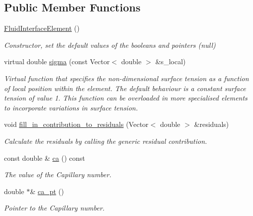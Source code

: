 \subsection*{Public Member Functions}
\begin{DoxyCompactItemize}
\item 
\hyperlink{classoomph_1_1FluidInterfaceElement_a4bd4a44ee08780fb8ba1be83c4353dd4}{Fluid\+Interface\+Element} ()
\begin{DoxyCompactList}\small\item\em Constructor, set the default values of the booleans and pointers (null) \end{DoxyCompactList}\item 
virtual double \hyperlink{classoomph_1_1FluidInterfaceElement_a7e5c3ca1eba5d4dd44c0eab9be252c2a}{sigma} (const Vector$<$ double $>$ \&s\+\_\+local)
\begin{DoxyCompactList}\small\item\em Virtual function that specifies the non-\/dimensional surface tension as a function of local position within the element. The default behaviour is a constant surface tension of value 1. This function can be overloaded in more specialised elements to incorporate variations in surface tension. \end{DoxyCompactList}\item 
void \hyperlink{classoomph_1_1FluidInterfaceElement_a3f66ffd5d9a8b9b6bd8cd54e90ce2d61}{fill\+\_\+in\+\_\+contribution\+\_\+to\+\_\+residuals} (Vector$<$ double $>$ \&residuals)
\begin{DoxyCompactList}\small\item\em Calculate the residuals by calling the generic residual contribution. \end{DoxyCompactList}\item 
const double \& \hyperlink{classoomph_1_1FluidInterfaceElement_abcb18ff13b322136dd2346a6b40ecabc}{ca} () const
\begin{DoxyCompactList}\small\item\em The value of the Capillary number. \end{DoxyCompactList}\item 
double $\ast$\& \hyperlink{classoomph_1_1FluidInterfaceElement_a1a950f0202d6dd15fab2f0c03927edc9}{ca\+\_\+pt} ()
\begin{DoxyCompactList}\small\item\em Pointer to the Capillary number. \end{DoxyCompactList}\item 

\end{DoxyCompactItemize}
